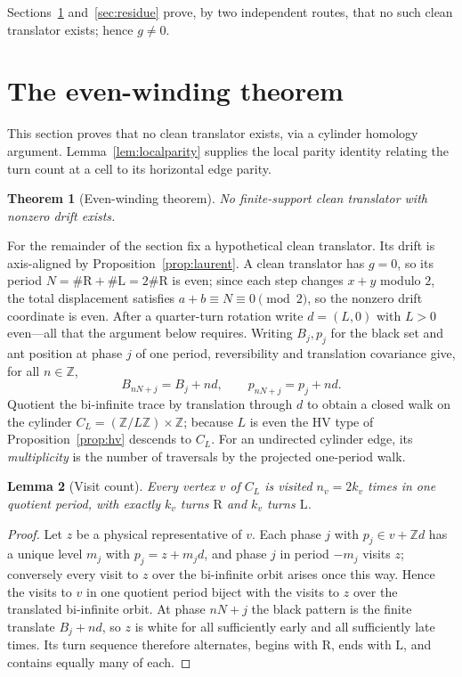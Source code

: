 \documentclass[11pt,letterpaper]{article}
\theoremstyle{plain}
\newtheorem{theorem}{Theorem}[section]
\newtheorem{lemma}[theorem]{Lemma}
\theoremstyle{definition}
\newcommand{\Z}{\mathbb{Z}}
\newcommand{\drift}{d}
\newcommand{\growth}{g}
\newcommand{\turnR}{\mathrm{R}}
\newcommand{\turnL}{\mathrm{L}}
\begin{document}
\begin{NoHyper}
Sections~\ref{sec:evenwinding} and~\ref{sec:residue} prove, by two independent
routes, that no such clean translator exists; hence $\growth\neq0$.

\section{The even-winding theorem}\label{sec:evenwinding}

This section proves that no clean translator exists, via a cylinder homology
argument. Lemma~\ref{lem:localparity} supplies the local parity identity
relating the turn count at a cell to its horizontal edge parity.

\begin{theorem}[Even-winding theorem]\label{thm:evenwinding}
No finite-support clean translator with nonzero drift exists.
\end{theorem}

For the remainder of the section fix a hypothetical clean translator. Its drift is
axis-aligned by Proposition~\ref{prop:laurent}. A clean translator has $\growth=0$, so
its period $N=\#\turnR+\#\turnL=2\#\turnR$ is even; since each step changes $x+y$
modulo $2$, the total displacement satisfies $a+b\equiv N\equiv0\pmod2$, so the
nonzero drift coordinate is even. After a quarter-turn rotation write $\drift=(L,0)$
with $L>0$ even---all that the argument below requires. Writing $B_j,p_j$ for the black
set and ant position at phase $j$ of one period, reversibility and translation
covariance give, for all $n\in\Z$,
\[
B_{nN+j}=B_j+n\drift,\qquad p_{nN+j}=p_j+n\drift .
\]
Quotient the bi-infinite trace by translation through $\drift$ to obtain a closed
walk on the cylinder $C_L=(\Z/L\Z)\times\Z$; because $L$ is even the HV type of
Proposition~\ref{prop:hv} descends to $C_L$. For an undirected cylinder edge, its
\emph{multiplicity} is the number of traversals by the projected one-period walk.

\begin{lemma}[Visit count]\label{lem:visit}
Every vertex $v$ of $C_L$ is visited $n_v=2k_v$ times in one quotient period, with
exactly $k_v$ turns $\turnR$ and $k_v$ turns $\turnL$.
\end{lemma}

\begin{proof}
Let $z$ be a physical representative of $v$. Each phase $j$ with $p_j\in v+\Z\drift$
has a unique level $m_j$ with $p_j=z+m_j\drift$, and phase $j$ in period $-m_j$ visits
$z$; conversely every visit to $z$ over the bi-infinite orbit arises once this way.
Hence the visits to $v$ in one quotient period biject with the visits to $z$ over the
translated bi-infinite orbit. At phase $nN+j$ the black pattern is the finite translate
$B_j+n\drift$, so $z$ is white for all sufficiently early and all sufficiently
late times. Its turn sequence therefore alternates, begins with $\turnR$, ends with
$\turnL$, and contains equally many of each.
\end{proof}


\end{NoHyper}
\end{document}
